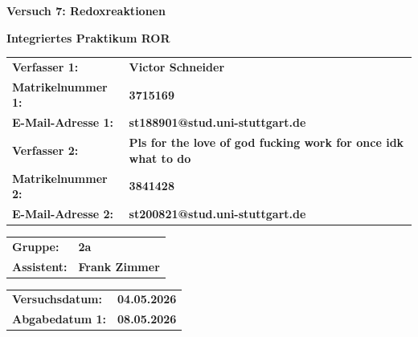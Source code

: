 \documentclass[12pt]{scrartcl} %
\begin{document}

\begin{titlepage}
\begin{center}
\vspace*{2cm}
\begin{LARGE}
\vspace*{1cm}
\textbf{\textsf{Versuch 7: Redoxreaktionen\\}}
\end{LARGE}
\vspace*{1cm}
\textbf{\textsf{Integriertes Praktikum ROR}}\\
\vspace*{1.5cm}


\begin{table}[H]
\sffamily

\hspace*{3cm}\begin{tabular}{>{\bfseries}l>{\bfseries}l}
Verfasser 1: & Victor Schneider\\
Matrikelnummer 1: & 3715169\\
E-Mail-Adresse 1: & st188901@stud.uni-stuttgart.de\\
Verfasser 2: & Pls for the love of god fucking work for once idk what to do\\
Matrikelnummer 2: & 3841428\\
E-Mail-Adresse 2: & st200821@stud.uni-stuttgart.de\\
\end{tabular}
\vspace{1cm}

\hspace*{3cm}\begin{tabular}{>{\bfseries}l>{\bfseries}l}
    Gruppe: & 2a \\
    Assistent: & Frank Zimmer
\end{tabular}
\vspace{1cm}

\hspace*{3cm}\begin{tabular}{>{\bfseries}l>{\bfseries}l}
   Versuchsdatum: & 04.05.2026 \\
   Abgabedatum 1: & 08.05.2026 \\ 
\end{tabular}
\end{table}
\end{center}

\end{titlepage}
\end{document}
